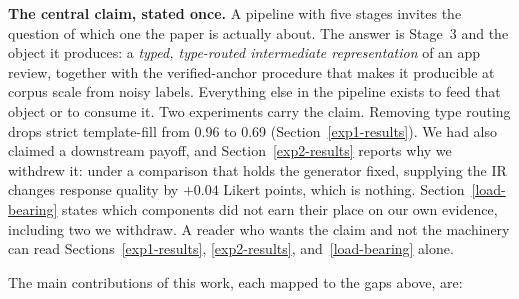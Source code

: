 \documentclass[sigconf, anonymous]{acmart}
\begin{document}
\textbf{The central claim, stated once.} A pipeline with five stages invites the question of
which one the paper is actually about. The answer is Stage~3 and the object it produces: a
\emph{typed, type-routed intermediate representation} of an app review, together with the
verified-anchor procedure that makes it producible at corpus scale from noisy labels. Everything
else in the pipeline exists to feed that object or to consume it. Two experiments carry the
claim. Removing type routing drops strict template-fill from 0.96 to 0.69
(Section~\ref{exp1-results}). We had also claimed a downstream payoff, and Section~\ref{exp2-results}
reports why we withdrew it: under a comparison that holds the generator fixed, supplying the IR
changes response quality by $+0.04$ Likert points, which is nothing. Section~\ref{load-bearing} states which components did
not earn their place on our own evidence, including two we withdraw. A reader who wants the
claim and not the machinery can read Sections~\ref{exp1-results}, \ref{exp2-results},
and~\ref{load-bearing} alone.

The main contributions of this work, each mapped to the gaps above, are:
\end{document}
